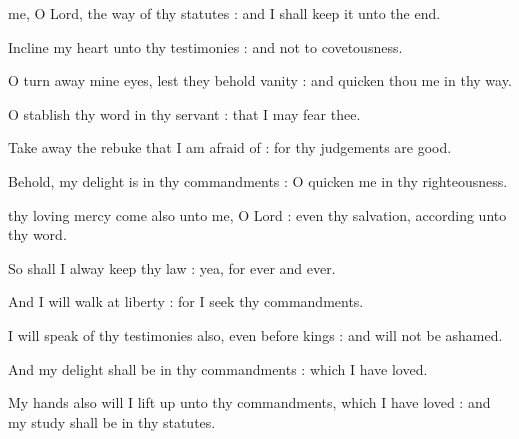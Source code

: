 
 me, O Lord, the way of thy statutes : and I shall keep it unto the end.\par
{}
Incline my heart unto thy testimonies : and not to covetousness.\par
{}O turn away mine eyes, lest they behold vanity : and quicken thou me in thy way.\par
{}O stablish thy word in thy servant : that I may fear thee.\par
{}Take away the rebuke that I am afraid of : for thy judgements are good.\par
{}Behold, my delight is in thy commandments : O quicken me in thy righteousness.\par

 thy loving mercy come also unto me, O Lord : even thy salvation, according unto thy word.\par
{}
So shall I alway keep thy law : yea, for ever and ever.\par
{}And I will walk at liberty : for I seek thy commandments.\par
{}I will speak of thy testimonies also, even before kings : and will not be ashamed.\par
{}And my delight shall be in thy commandments : which I have loved.\par
{}My hands also will I lift up unto thy commandments, which I have loved : and my study shall be in thy statutes.\par

